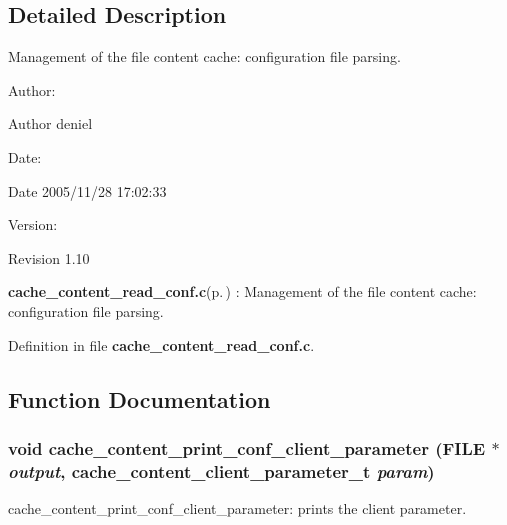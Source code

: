 \subsection{Detailed Description}
Management of the file content cache: configuration file parsing. 

\begin{Desc}
\item[Author:]\begin{Desc}
\item[Author]deniel \end{Desc}
\end{Desc}
\begin{Desc}
\item[Date:]\begin{Desc}
\item[Date]2005/11/28 17:02:33 \end{Desc}
\end{Desc}
\begin{Desc}
\item[Version:]\begin{Desc}
\item[Revision]1.10 \end{Desc}
\end{Desc}
{\bf cache\_\-content\_\-read\_\-conf.c}{\rm (p.\,\pageref{cache__content__read__conf_8c})} : Management of the file content cache: configuration file parsing.

Definition in file {\bf cache\_\-content\_\-read\_\-conf.c}.

\subsection{Function Documentation}
\subsubsection{\setlength{\rightskip}{0pt plus 5cm}void cache\_\-content\_\-print\_\-conf\_\-client\_\-parameter (FILE $\ast$ {\em output}, cache\_\-content\_\-client\_\-parameter\_\-t {\em param})}\label{cache__content__read__conf_8c_a1}


cache\_\-content\_\-print\_\-conf\_\-client\_\-parameter: prints the client parameter.

